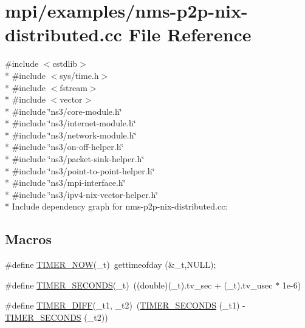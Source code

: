 \hypertarget{nms-p2p-nix-distributed_8cc}{}\section{mpi/examples/nms-\/p2p-\/nix-\/distributed.cc File Reference}
\label{nms-p2p-nix-distributed_8cc}
{\ttfamily \#include $<$cstdlib$>$}\\*
{\ttfamily \#include $<$sys/time.\+h$>$}\\*
{\ttfamily \#include $<$fstream$>$}\\*
{\ttfamily \#include $<$vector$>$}\\*
{\ttfamily \#include \char`\"{}ns3/core-\/module.\+h\char`\"{}}\\*
{\ttfamily \#include \char`\"{}ns3/internet-\/module.\+h\char`\"{}}\\*
{\ttfamily \#include \char`\"{}ns3/network-\/module.\+h\char`\"{}}\\*
{\ttfamily \#include \char`\"{}ns3/on-\/off-\/helper.\+h\char`\"{}}\\*
{\ttfamily \#include \char`\"{}ns3/packet-\/sink-\/helper.\+h\char`\"{}}\\*
{\ttfamily \#include \char`\"{}ns3/point-\/to-\/point-\/helper.\+h\char`\"{}}\\*
{\ttfamily \#include \char`\"{}ns3/mpi-\/interface.\+h\char`\"{}}\\*
{\ttfamily \#include \char`\"{}ns3/ipv4-\/nix-\/vector-\/helper.\+h\char`\"{}}\\*
Include dependency graph for nms-\/p2p-\/nix-\/distributed.cc\+:
\subsection*{Macros}
\begin{DoxyCompactItemize}
\item 
\#define \hyperlink{nms-p2p-nix-distributed_8cc_a4ea1f7c69e863076962d247fee766870}{T\+I\+M\+E\+R\+\_\+\+N\+OW}(\+\_\+t)~gettimeofday (\&\+\_\+t,N\+U\+LL);
\item 
\#define \hyperlink{nms-p2p-nix-distributed_8cc_a6ea93eec918073a64885fa89d19e7b06}{T\+I\+M\+E\+R\+\_\+\+S\+E\+C\+O\+N\+DS}(\+\_\+t)~((double)(\+\_\+t).tv\+\_\+sec + (\+\_\+t).tv\+\_\+usec $\ast$ 1e-\/6)
\item 
\#define \hyperlink{nms-p2p-nix-distributed_8cc_ad474bed5f9f85ea66d5cf9a9648d4a72}{T\+I\+M\+E\+R\+\_\+\+D\+I\+FF}(\+\_\+t1,  \+\_\+t2)~(\hyperlink{nms-p2p-nix_8cc_a6ea93eec918073a64885fa89d19e7b06}{T\+I\+M\+E\+R\+\_\+\+S\+E\+C\+O\+N\+DS} (\+\_\+t1) -\/ \hyperlink{nms-p2p-nix_8cc_a6ea93eec918073a64885fa89d19e7b06}{T\+I\+M\+E\+R\+\_\+\+S\+E\+C\+O\+N\+DS} (\+\_\+t2))
\end{DoxyCompactItemize}
